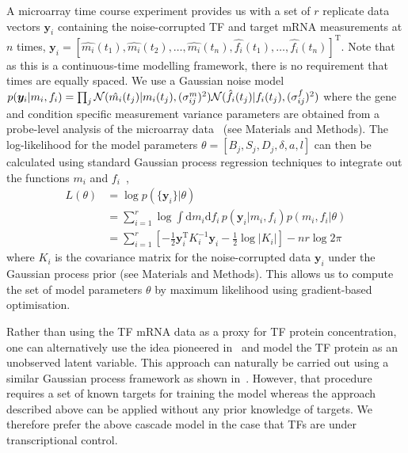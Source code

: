 \documentclass{pnastwo}
\begin{document}
\begin{article}
A microarray time course experiment provides us with a set of $r$
replicate data vectors $\bm y_i$ containing the noise-corrupted TF and target mRNA
measurements at $n$ times,
$\bm y_i=[\hat{m_i}(t_1),\hat{m_i}(t_2),\ldots,\hat{m_i}(t_n),\hat{f_i}(t_1),\ldots,\hat{f_i}(t_n)]^\mathrm{T}$. Note
that as this is a continuous-time modelling framework, there is no
requirement that times are equally spaced. We use a Gaussian noise model
$p(\bm y_i|m_i,f_i)=\prod_{j}{\cal
  N}(\hat{m_i}(t_j)|m_i(t_j),(\sigma^m_{ij})^2){\cal
  N}(\hat{f_i}(t_j)|f_i(t_j),(\sigma^f_{ij})^2)$ where the gene and condition
specific measurement variance parameters are obtained from a probe-level analysis of the microarray data~\cite{Liu2005,Pearson2009} (see
Materials and Methods). The log-likelihood for the model parameters
$\theta=[B_j,S_j,D_j,\delta,a,l]$ can then be calculated using standard Gaussian process regression
techniques to integrate out the functions $m_i$ and $f_i$~\cite{Rasmussen2006},
\begin{equation*}
  \begin{split}
    L(\theta) & = \log p(\{\bm y_i\}|\theta) \\
    & = \sum_{i=1}^r \log \!\int \!\mathrm{d}m_i\mathrm{d}f_i\,
    p(\bm y_i|m_i,f_i)p(m_i,f_i|\theta)  \\
    & = \sum_{i=1}^r \left[-\frac{1}{2}\bm y_i^\mathrm{T} K_i^{-1} \bm y_i -
      \frac{1}{2}\log|K_i|\right] -nr\log 2\pi
  \end{split}
\end{equation*}
where $K_i$ is the covariance matrix for the
noise-corrupted data $\bm y_i$ under the Gaussian process prior (see
Materials and Methods). This allows us to compute the set of model
parameters $\theta$ by maximum
likelihood using gradient-based optimisation. 

Rather than using the TF mRNA data as a proxy for TF protein concentration,
one can alternatively use the idea pioneered
in~\cite{Barenco2006a} and model the TF protein as an unobserved
latent variable. This approach can naturally be carried out using a
similar Gaussian process framework as shown in~\cite{Gao2008}. However, that procedure requires a set of known
targets for training the model whereas the approach described above
can be applied without any prior knowledge of targets. We therefore
prefer the above cascade model in the case that TFs are under
transcriptional control. 


\end{article}
\end{document}
